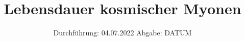 

\subject{V01}
\title{Lebensdauer kosmischer Myonen}
\date{%
  Durchführung: 04.07.2022
  \hspace{3em}
  Abgabe: DATUM
}



\maketitle
\thispagestyle{empty}
\tableofcontents
\newpage







\nocite{*}
\printbibliography{}



